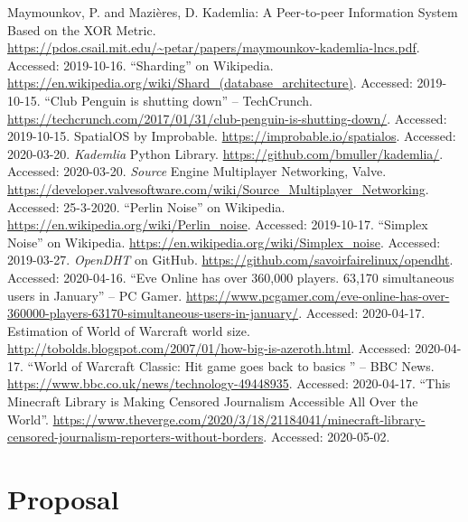 \documentclass[12pt,notitlepage,a4paper]{report}
\begin{document}
	\clearpage
	
	\begin{thebibliography}{9}
		 Maymounkov, P. and Mazières, D. Kademlia: A Peer-to-peer Information System Based on the XOR Metric. \url{https://pdos.csail.mit.edu/~petar/papers/maymounkov-kademlia-lncs.pdf}. Accessed: 2019-10-16.
		 ``Sharding'' on Wikipedia. \url{https://en.wikipedia.org/wiki/Shard_(database_architecture)}. Accessed: 2019-10-15.
		 ``Club Penguin is shutting down'' -- TechCrunch. \url{https://techcrunch.com/2017/01/31/club-penguin-is-shutting-down/}. Accessed: 2019-10-15.
		 SpatialOS by Improbable. \url{https://improbable.io/spatialos}. Accessed: 2020-03-20.
		 \emph{Kademlia} Python Library. \url{https://github.com/bmuller/kademlia/}. Accessed: 2020-03-20.
		 \emph{Source} Engine Multiplayer Networking, Valve. \url{https://developer.valvesoftware.com/wiki/Source_Multiplayer_Networking}. Accessed: 25-3-2020.
		 ``Perlin Noise'' on Wikipedia. \url{https://en.wikipedia.org/wiki/Perlin_noise}. Accessed: 2019-10-17.
		 ``Simplex Noise'' on Wikipedia.
		\url{https://en.wikipedia.org/wiki/Simplex_noise}. Accessed: 2019-03-27.
		 \emph{OpenDHT} on GitHub. \url{https://github.com/savoirfairelinux/opendht}. Accessed: 2020-04-16.
		 ``Eve Online has over 360,000 players. 63,170 simultaneous users in January'' -- PC Gamer. \url{https://www.pcgamer.com/eve-online-has-over-360000-players-63170-simultaneous-users-in-january/}. Accessed: 2020-04-17.
		 Estimation of World of Warcraft world size. \url{http://tobolds.blogspot.com/2007/01/how-big-is-azeroth.html}. Accessed: 2020-04-17.
		 ``World of Warcraft Classic: Hit game goes back to basics
		'' -- BBC News. \url{https://www.bbc.co.uk/news/technology-49448935}. Accessed: 2020-04-17.
		 ``This Minecraft Library is Making Censored Journalism Accessible All Over the World''. \url{https://www.theverge.com/2020/3/18/21184041/minecraft-library-censored-journalism-reporters-without-borders}. Accessed: 2020-05-02.
	\end{thebibliography}
	\clearpage
	
	\appendix
	\chapter{Proposal}
	
\end{document}

